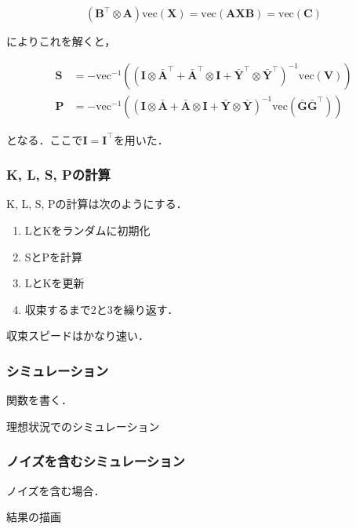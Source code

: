 \begin{equation}
(\mathbf{B}^\top \otimes \mathbf{A})\text{vec}(\mathbf{X}) = \text{vec}(\mathbf{A}\mathbf{X}\mathbf{B})=\text{vec}(\mathbf{C})
\end{equation}


によりこれを解くと，


\begin{align}
\mathbf{S} &= -\text{vec}^{-1}\left(\left(\mathbf{I} \otimes \bar{\mathbf{A}}^\top + \bar{\mathbf{A}}^\top \otimes \mathbf{I} + \bar{\mathbf{Y}}^\top \otimes \bar{\mathbf{Y}}^\top\right)^{-1}\text{vec}(\mathbf{V})\right)\\
\mathbf{P} &= -\text{vec}^{-1}\left(\left(\mathbf{I} \otimes \bar{\mathbf{A}} + \bar{\mathbf{A}} \otimes \mathbf{I} + \bar{\mathbf{Y}} \otimes \bar{\mathbf{Y}}\right)^{-1}\text{vec}(\bar{\mathbf{G}}\bar{\mathbf{G}}^\top)\right)
\end{align}


となる．ここで$\mathbf{I}=\mathbf{I}^\top$を用いた．
\subsubsection{K, L, S, Pの計算}
K, L, S, Pの計算は次のようにする．
\begin{enumerate}
\item LとKをランダムに初期化
\item SとPを計算
\item LとKを更新
\item 収束するまで2と3を繰り返す．
\end{enumerate}

収束スピードはかなり速い．


\subsubsection{シミュレーション}
関数を書く．

理想状況でのシミュレーション


\subsubsection{ノイズを含むシミュレーション}
ノイズを含む場合．

結果の描画


